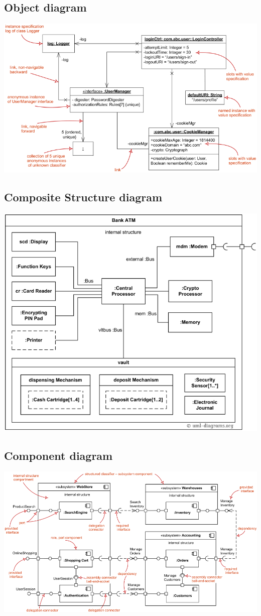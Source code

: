 \subsection{Object diagram}
\includegraphics[width=\linewidth]{4-uml/object.png}

\subsection{Composite Structure diagram}
\includegraphics[width=\linewidth]{4-uml/composite.png}

\subsection{Component diagram}
\includegraphics[width=\linewidth]{4-uml/component.png}

